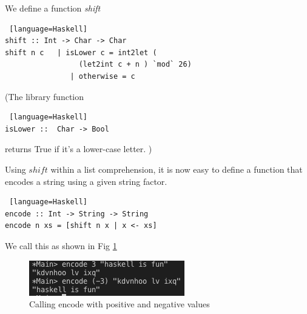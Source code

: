\documentclass[11pt]{article}
\def\frametitle#1{}
\begin{document}
 \begin{frame}[fragile, label=encoding2]
  \frametitle{Encoding and Decoding contd. } 
 We define a function \textit{shift} 
 

  \begin{onlyenv}
  \begin{lstlisting} [language=Haskell]
shift :: Int -> Char -> Char
shift n c   | isLower c = int2let ( 
                 (let2int c + n ) `mod` 26)
               | otherwise = c
 \end{lstlisting}
  \end{onlyenv}    
  
  (The library function
   \begin{onlyenv}
  \begin{lstlisting} [language=Haskell]
isLower ::  Char -> Bool
 \end{lstlisting}
  \end{onlyenv}    
returns True if it's a lower-case letter.  )
  \end{frame}

\begin{frame}[fragile, label=encoding3]
  \frametitle{Encoding and Decoding contd. } 
  Using $shift$ within a list comprehension, it is now easy to define a function that encodes a string using a given string factor.
    \begin{onlyenv}
  \begin{lstlisting} [language=Haskell]
encode :: Int -> String -> String 
encode n xs = [shift n x | x <- xs]
 \end{lstlisting}
  \end{onlyenv}    
 
  We call this as shown in Fig \ref{encode}
  
  \begin{figure}
			\centering
			\includegraphics[page=1,width=.5\textwidth]{img/02.png}
			\caption {Calling encode with positive and negative values}
			\label{encode}
		\end{figure}
\end{frame}
\end{document}
